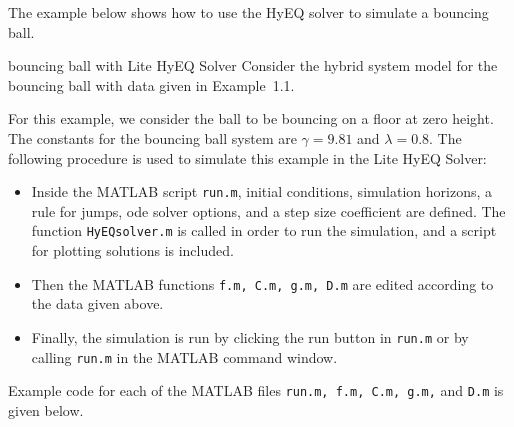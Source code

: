 The example below shows how to use the HyEQ solver to simulate a bouncing ball.

\begin{example}{bouncing ball with Lite HyEQ Solver}
\label{ex:bblite} Consider the hybrid system model for the bouncing ball with data given in Example~1.1.

For this example, we consider the ball to be bouncing on a floor at zero height. The constants for the bouncing ball system are $\gamma = 9.81$ and $\lambda=0.8$.
The following procedure is used to simulate this example in the Lite HyEQ Solver:
\begin{itemize}
\item Inside the MATLAB script {\tt run.m}, initial conditions, simulation horizons, a rule for jumps, ode solver options, and a step size coefficient are defined. The function {\tt HyEQsolver.m} is called in order to run the simulation, and a script for plotting solutions is included.
\item Then the MATLAB functions {\tt f.m, C.m, g.m, D.m} are edited according to the data given above.
\item Finally, the simulation is run by clicking the run button in {\tt run.m} or by calling {\tt run.m} in the MATLAB command window.
\end{itemize}

Example code for each of the MATLAB files {\tt run.m, f.m, C.m, g.m,} and {\tt D.m} is given below.\\

\label{scr:run}

\label{scr:f}

\label{scr:C}

\label{scr:g}

\label{scr:D}


\end{example}
